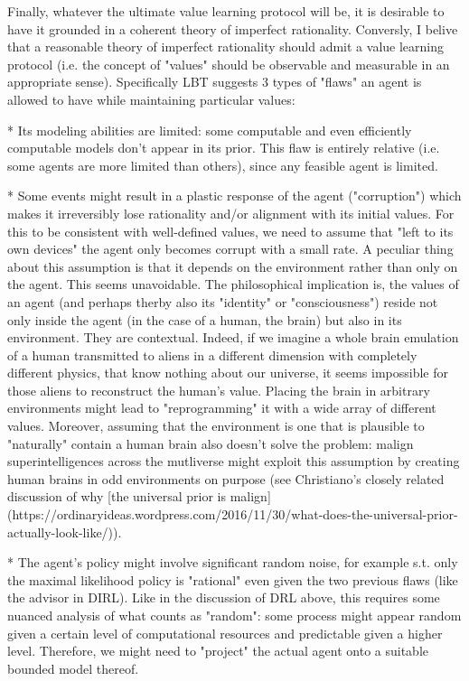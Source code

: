 \documentclass[a4paper]{article}
\begin{document}
Finally, whatever the ultimate value learning protocol will be, it is desirable to have it grounded in a coherent theory of imperfect rationality. Conversly, I belive that a reasonable theory of imperfect rationality should admit a value learning protocol (i.e. the concept of "values" should be observable and measurable in an appropriate sense). Specifically LBT suggests 3 types of "flaws" an agent is allowed to have while maintaining particular values:

* Its modeling abilities are limited: some computable and even efficiently computable models don't appear in its prior. This flaw is entirely relative (i.e. some agents are more limited than others), since any feasible agent is limited.

* Some events might result in a plastic response of the agent ("corruption") which makes it irreversibly lose rationality and/or alignment with its initial values. For this to be consistent with well-defined values, we need to assume that "left to its own devices" the agent only becomes corrupt with a small rate. A peculiar thing about this assumption is that it depends on the environment rather than only on the agent. This seems unavoidable. The philosophical implication is, the values of an agent (and perhaps therby also its "identity" or "consciousness") reside not only inside the agent (in the case of a human, the brain) but also in its environment. They are contextual. Indeed, if we imagine a whole brain emulation of a human transmitted to aliens in a different dimension with completely different physics, that know nothing about our universe, it seems impossible for those aliens to reconstruct the human's value. Placing the brain in arbitrary environments might lead to "reprogramming" it with a wide array of different values. Moreover, assuming that the environment is one that is plausible to "naturally" contain a human brain also doesn't solve the problem: malign superintelligences across the mutliverse might exploit this assumption by creating human brains in odd environments on purpose (see Christiano's closely related discussion of why [the universal prior is malign](https://ordinaryideas.wordpress.com/2016/11/30/what-does-the-universal-prior-actually-look-like/)).

* The agent's policy might involve significant random noise, for example s.t. only the maximal likelihood policy is "rational" even given the two previous flaws (like the advisor in DIRL). Like in the discussion of DRL above, this requires some nuanced analysis of what counts as "random": some process might appear random given a certain level of computational resources and predictable given a higher level. Therefore, we might need to "project" the actual agent onto a suitable bounded model thereof.
\end{document}
